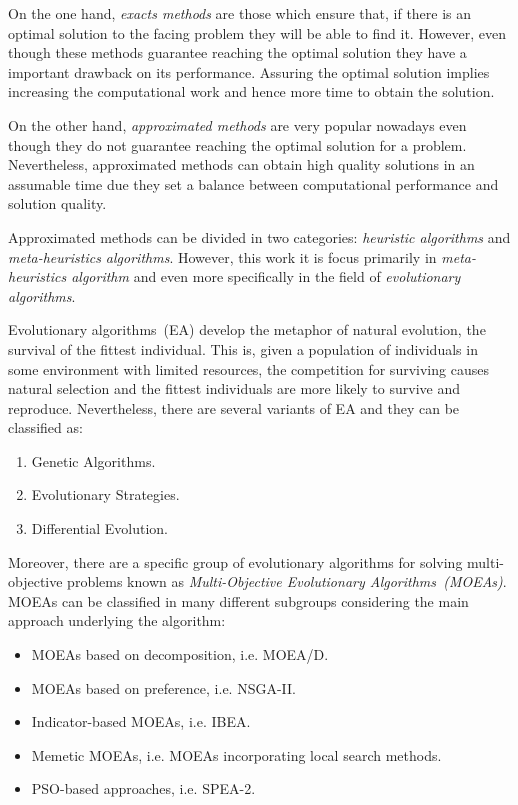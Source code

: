 On the one hand, \textit{exacts methods} are those which ensure that, if there is an optimal solution to the facing problem they will be able to find it. However, even though these methods guarantee reaching the optimal solution they have a important drawback on its performance. Assuring the optimal solution implies increasing the computational work and hence more time to obtain the solution.

On the other hand, \textit{approximated methods} are very popular nowadays even though they do not guarantee reaching the optimal solution for a problem. Nevertheless, approximated methods can obtain high quality solutions in an assumable time due they set a balance between computational performance and solution quality. 

Approximated methods can be divided in two categories: \textit{heuristic algorithms} and \textit{meta-heuristics algorithms}. However, this work it is focus primarily in \textit{meta-heuristics algorithm} and even more specifically in the field of \textit{evolutionary algorithms}.

Evolutionary algorithms~(EA) develop the metaphor of natural evolution, the survival of the fittest individual\cite{eiben}. This is, given a population of individuals in some environment with limited resources, the competition for surviving causes natural selection and the fittest individuals are more likely to survive and reproduce. Nevertheless, there are several variants of EA and they can be classified as:
\begin{enumerate}
    \item Genetic Algorithms\cite{Whitley1994, Algorithms2004, Sivanandam2008}.
    \item Evolutionary Strategies\cite{Beyer2002, Hansen2017}.
    \item Differential Evolution\cite{Algorithm2006, DE1, DE2, DE3}.
\end{enumerate}

Moreover, there are a specific group of evolutionary algorithms for solving multi-objective problems known as \textit{Multi-Objective Evolutionary Algorithms~(MOEAs)}. MOEAs can be classified in many different subgroups considering the main approach underlying the algorithm\cite{ZHOU201132}:
\begin{itemize}
    \item MOEAs based on decomposition, i.e. MOEA/D\cite{Zhang2007, Ma2018}.
    \item MOEAs based on preference, i.e. NSGA-II\cite{996017}.
    \item Indicator-based MOEAs, i.e. IBEA\cite{IBEA}.
    \item Memetic MOEAs, i.e. MOEAs incorporating local search methods.
    \item PSO-based approaches, i.e. SPEA-2\cite{Laumanns2001SPEA2}.
\end{itemize}

